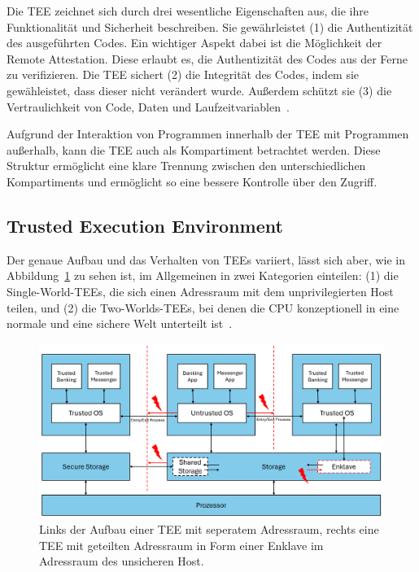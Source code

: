 Die TEE zeichnet sich durch drei wesentliche Eigenschaften aus, die ihre Funktionalität und Sicherheit beschreiben. 
Sie gewährleistet (1) die Authentizität des ausgeführten Codes.
Ein wichtiger Aspekt dabei ist die Möglichkeit der Remote Attestation. Diese erlaubt es, die Authentizität des Codes aus der Ferne zu verifizieren. 
Die TEE sichert (2) die Integrität des Codes, indem sie gewähleistet, dass dieser nicht verändert wurde. Außerdem schützt sie (3) die Vertraulichkeit von Code, Daten und Laufzeitvariablen~\cite{Trusted}.

Aufgrund der Interaktion von Programmen innerhalb der TEE mit Programmen außerhalb, kann die TEE auch als Kompartiment betrachtet werden. Diese Struktur ermöglicht eine klare Trennung zwischen den unterschiedlichen Kompartiments und ermöglicht so eine bessere Kontrolle über den Zugriff.

\subsection{Trusted Execution Environment}
Der genaue Aufbau und das Verhalten von TEEs variiert, lässt sich aber, wie in Abbildung~\ref{fig:TEE} zu sehen ist, im Allgemeinen in zwei Kategorien einteilen: (1) die Single-World-TEEs, die sich einen Adressraum mit dem unprivilegierten Host teilen, und (2) die Two-Worlds-TEEs, bei denen die CPU konzeptionell in eine normale und eine sichere Welt unterteilt ist~\cite{TEEPaper}.

\begin{figure}[h]
    \centering
    \includegraphics[width=\linewidth]{Grafiken/TEE-Grafik.png}
    \caption{Links der Aufbau einer TEE mit seperatem Adressraum, rechts eine TEE mit geteilten Adressraum in Form einer Enklave im Adressraum des unsicheren Host.}
    \label{fig:TEE}
\end{figure}

